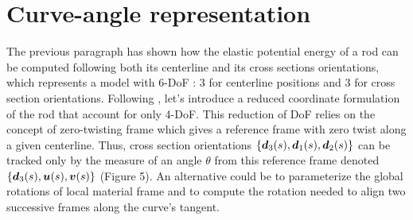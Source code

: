 \section{Curve-angle representation}
The previous paragraph has shown how the elastic potential energy of a rod can be computed following both its centerline and its cross sections orientations, which represents a model with 6-DoF : 3 for centerline positions and 3 for cross section orientations. Following \cite{Bergou2008}, let’s introduce a reduced coordinate formulation of the rod that account for only 4-DoF. This reduction of DoF relies on the concept of zero-twisting frame which gives a reference frame with zero twist along a given centerline. Thus, cross section orientations $\{\boldsymbol{d}_3 (s),\boldsymbol{d}_1 (s),\boldsymbol{d}_2 (s)\}$ can be tracked only by the measure of an angle $\theta$ from this reference frame denoted $\{\boldsymbol{d}_3(s),\boldsymbol{u}(s),\boldsymbol{v}(s)\}$ (Figure 5). An alternative could be to parameterize the global rotations of local material frame and to compute the rotation needed to align two successive frames along the curve’s tangent.

